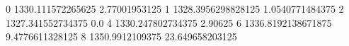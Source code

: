 0 1330.111572265625 2.77001953125
1 1328.3956298828125 1.0540771484375
2 1327.341552734375 0.0
4 1330.247802734375 2.90625
6 1336.8192138671875 9.4776611328125
8 1350.9912109375 23.649658203125
